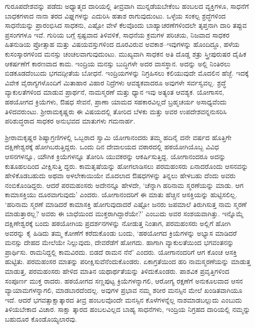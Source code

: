 ಗುರೂಪದೇಶವನ್ನು ಪಡೆದು ಅಧ್ಯಾತ್ಮದ ದಾರಿಯಲ್ಲಿ ತೀವ್ರವಾಗಿ ಮುನ್ನಡೆಯಬೇಕೆಂಬ ಹಂಬಲದ ವ್ಯಕ್ತಿಗಳೂ, ಸಾಧನೆಗೆ ಬಾಧಕಗಳಾದ ನಾನಾ ತರದ ವಿಘ್ನಗಳನ್ನು ಎದುರಿಸಿ ಹತಾಶ ರಾಗುವುದುಂಟು. ಒಳ್ಳೆಯ ಸಂಕಲ್ಪ ಶ್ರದ್ಧೆಗಳಿಂದ ಸಾಧನೆಯನ್ನು ಪ್ರಾರಂಭಿಸಿದ ಸಾಧಕನು, ಎಷ್ಟೋ ವೇಳೆ ಕೆಲವೊಂದು ಬಾಹ್ಯಾಚರಣೆಗಳಿಂದಲೇ ತೃಪ್ತನಾಗಿ ದಾರಿ ತಪ್ಪುವ ಪ್ರಸಂಗಗಳೂ ಇವೆ. ಗುರಿಯ ಬಗ್ಗೆ ಸ್ಪಷ್ಟವಾದ ತಿಳಿವಳಿಕೆ, ಸಾಧನೆಯ ಕ್ರಮಗಳ ಪರಿಚಯ, ನಿಜವಾದ ಸಾಧಕರ ಹಿತನುಡಿಯ ಪ್ರೋತ್ಸಾಹ ಮತ್ತು ವಿಷಯವಸ್ತುಗಳಿಂದ ದೂರವಿರುವ ಅವಕಾಶ–ಇವುಗಳನ್ನು ಹೊಂದಿದ್ದೂ, ಹಳೆಯ ಕುಸಂಸ್ಕಾರಗಳಿಂದ ಮನಸ್ಸು ಚಂಚಲವಾಗುವುದುಂಟು. ಮುಖ್ಯವಾಗಿ ಸಾಧಕನ ಅತಿ ದೊಡ್ಡ ಶತ್ರು ಸ್ತ್ರೀಪುರುಷರ ದೈಹಿಕ ಆಕರ್ಷಣೆಗೆ ಕಾರಣವಾದ ಕಾಮ. ಇಂದ್ರಿಯ ಮನಸ್ಸು ಬುದ್ಧಿಗಳೇ ಅದರ ವಾಸಸ್ಥಾನ. ಅದನ್ನು ಅಲ್ಲಿ ನಿಂತಿರಲು ಬಿಡಕೂಡದೆಂಬುದು ಭಗವದ್ಗೀತೆಯ ಬೋಧನೆ. ಇಂದ್ರಿಯಗಳನ್ನು ನಿಗ್ರಹಿಸಲು ಕಲಿಯುವುದೇ ಮೊದಲಿನ ಹೆಜ್ಜೆ. ಇದಕ್ಕೆ ವಿವೇಕ ವೈರಾಗ್ಯಗಳೊಂದಿಗೆ ಮಿತಾಹಾರ ವಿಹಾರ ನಿದ್ರೆಗಳು ಆವಶ್ಯಕವಾದರೂ ಅವುಗಳೇ ಸರ್ವಸ್ವವಲ್ಲ. ಶ್ರದ್ಧೆ ವ್ಯಾಕುಲತೆಗಳಿಂದ ಮಾಡುವ ಪ್ರಾರ್ಥನೆ, ನಾಮಸ್ಮರಣೆ ಮತ್ತು ಧ್ಯಾನ ಇವು ಅತ್ಯಂತ ಆವಶ್ಯಕ. ಯೋಗಾಸನ, ಹಠಯೋಗದ ಕ್ರಿಯೆಗಳು, ಔಷಧ ಸೇವನೆ, ಪ್ರಾಣಾ ಯಾಮದ ಸಹಕಾರವಿಲ್ಲದೆ ಬ್ರಹ್ಮಚರ್ಯ ಅಸಾಧ್ಯವೆಂದು ತಿಳಿದವರುಂಟು. ಶ‍್ರೀರಾಮಕೃಷ್ಣರು ಈ ವಿಷಯದಲ್ಲಿ ತೋರಿದ ಬೆಳಕು ಮತ್ತು ಅವರ ಉಪದೇಶವನ್ನನುಸರಿಸಿ ಪರಿಶುದ್ಧರಾದ ಸಾಧಕರ ಅನುಭವದ ಮಾತುಗಳು ಗಮನಾರ್ಹ.

ಶ‍್ರೀರಾಮಕೃಷ್ಣರ ಶಿಷ್ಯಾಗ್ರಣಿಗಳಲ್ಲಿ ಒಬ್ಬರಾದ ಸ್ವಾಮಿ ಯೋಗಾನಂದರು ತಮ್ಮ ಹದಿನೈ ದನೇ ವರ್ಷದ ಹೊತ್ತಿಗೇ ದಕ್ಷಿಣೇಶ್ವರಕ್ಕೆ ಹೋಗಿಬರುತ್ತಿದ್ದರು. ಒಂದು ದಿನ ದೇವಾಲಯದ ವಠಾರದಲ್ಲಿ ಹಠಯೋಗಿಯೊಬ್ಬ ವಿವಿಧ ಆಸನಗಳನ್ನೂ, ಯೌಗಿಕ ಕ್ರಿಯೆಗಳನ್ನೂ ತೋರಿಸಿ ಯುವಕರನ್ನು ಆಕರ್ಷಿಸುತ್ತಿದ್ದ. ಯೋಗಾನಂದರೂ ಅದನ್ನು ಕುತೂಹಲದಿಂದ ವೀಕ್ಷಿಸುತ್ತಿ ದ್ದರು. ಕಾಮತೃಷೆಯನ್ನು ಹೋಗಲಾಡಿಸಲು ಪರಮಹಂಸರು ಏನಾದರೊಂದು ಆಸನವನ್ನು ಹೇಳಿಕೊಡಬಹುದು ಅಥವಾ ಅಳಲೇಕಾಯಿಯೇ ಮೊದಲಾದ ಔಷಧಗಳನ್ನು ತಿನ್ನಲು ಹೇಳಬಹು ದೆಂದು ಅವರು ನಂಬಿಕೊಂಡಿದ್ದರು. ಆದರೆ ಪರಮಹಂಸರು ಅದೇನನ್ನೂ ಹೇಳದೇ, ‘ಚೆನ್ನಾಗಿ ಹರಿನಾಮ ಸ್ಮರಣೆಯನ್ನು ಮಾಡು. ಆಗ ಕಾಮಾಸಕ್ತಿಯು ದೂರವಾಗುವುದು’ ಎಂದರು. ಯೋಗಾನಂದರಿಗೆ ಈ ಮಾತು ಹೆಚ್ಚಿನ ಆಸಕ್ತಿಯನ್ನು ಹುಟ್ಟಿಸಲಿಲ್ಲ. ‘ಹರಿನಾಮ ಸ್ಮರಣೆ ಮಾಡಿದರೆ ಕಾಮಾಸಕ್ತಿ ಹೋಗುವುದಾದರೆ ಎಷ್ಟೋ ಜನರು ಜಪಮಾಲೆ ತಿರುಗಿಸುತ್ತ ನಾಮ ಸ್ಮರಣೆ ಮಾಡುತ್ತಾರಲ್ಲ? ಅವರು ಈ ಬಾಧೆಯಿಂದ ಮುಕ್ತರಾಗಿದ್ದಾರೆಯೇ?’ ಎಂಬುದು ಅವರ ಸಂಶಯವಾಗಿತ್ತು. ಇನ್ನೊಮ್ಮೆ ದಕ್ಷಿಣೇಶ್ವರಕ್ಕೆ ಬಂದು ಹಠಯೋಗಿಯ ಪ್ರದರ್ಶನಗಳನ್ನು ನೋಡುತ್ತ ನಿಂತಾಗ, ಪರಮಹಂಸರು ಅಲ್ಲಿಗೆ ಹೋಗಿ ಅವರನ್ನು ಕೈ ಹಿಡಿದು ತಮ್ಮ ಕೋಣೆಗೆ ಕರೆದುಕೊಂಡು ಬಂದು, ‘ಹಠಯೋಗದ ಕ್ರಿಯೆಗಳನ್ನು ಅಭ್ಯಾಸ ಮಾಡಿದರೆ ಮನಸ್ಸು ದೇಹದ ಮೇಲೆಯೇ ನಿಲ್ಲುವುದು, ದೇವರೆಡೆಗೆ ಹೋಗದು. ಹಾಗಾಗಿ ವ್ಯಾಕುಲತೆಯಿಂದ ಭಗವಂತನನ್ನು ಪ್ರಾರ್ಥಿಸು. ರಾಮನಿದ್ದಲ್ಲಿ ಕಾಮವಿರದು. ಬಿಡದೆ ರಾಮನ ನೆನೆ’ ಎಂದರು. ಯೋಗಾನಂದರಿಗೆ ಆಗ ಕೊಂಚ ಆಸಕ್ತಿ ಹುಟ್ಟಿತು. ಪರಮಹಂಸರ ಮಾತನ್ನು ಪರೀಕ್ಷಿಸುವೆನೆಂದುಕೊಂಡರು. ಏಕಾಗ್ರತೆಯಿಂದ ಹರಿ ನಾಮಸ್ಮರಣೆಯನ್ನು ಮಾಡುತ್ತ ಮಾಡುತ್ತ, ಪರಮಹಂಸರು ಹೇಳಿದ ಮಾತಿನ ಯಥಾರ್ಥತೆಯನ್ನು ತಿಳಿದುಕೊಂಡರು. ಪಾಶವಿಕ ಪ್ರವೃತ್ತಿಗಳಿಂದ ಸಂಪೂರ್ಣ ಮುಕ್ತ ರಾದರು. ಹಠಯೋಗದ ಸಣ್ಣಪುಟ್ಟ ಕ್ರಿಯೆಗಳನ್ನಾಗಲಿ, ಆರೋಗ್ಯ ರಕ್ಷಣೆಗೆ ಅನುಕೂಲವಾದ ಆಸನ ವ್ಯಾಯಾಮಗಳನ್ನಾಗಲಿ, ಮಾಡಬಾರದೆಂದಲ್ಲ. ಅವುಗಳ ಪ್ರಭಾವ ನಮ್ಮ ಶರೀರ ಮನಸ್ಸಿನ ಮೇಲೆ ಖಂಡಿತವಾಗಿಯೂ ಇದೆ. ಆದರೆ ಭಗವತ್ಸಾಕ್ಷಾತ್ಕಾರದ ತೀವ್ರ ಹಂಬಲವೊಂದೇ ಮನಸ್ಸಿನ ಕೊಳೆಗಳನ್ನೆಲ್ಲ ನಾಶಮಾಡಬಲ್ಲುದು ಎಂಬುದು ತಿಳಿಯಬೇಕಾದ ವಿಚಾರ. ಸಾಕ್ಷಾ ತ್ಕಾರದ ಹಂಬಲವಿಲ್ಲದ ಬಾಹ್ಯ ಸಾಧನೆಗಳು, ಇಂದ್ರಿಯ ನಿಗ್ರಹದ ದಾರಿಯಲ್ಲಿ ನಮ್ಮನ್ನು ಬಹುದೂರ ಕೊಂಡೊಯ್ಯಲಾರವು.

